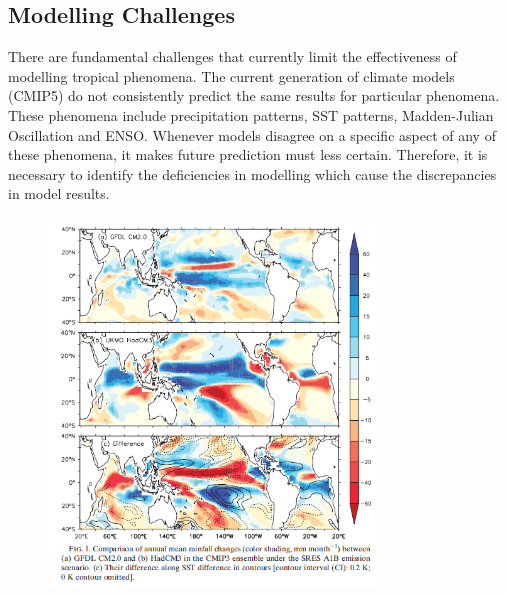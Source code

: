 \subsection{Modelling Challenges}

There are fundamental challenges that currently limit the effectiveness of modelling tropical phenomena.  The current generation of climate models (CMIP5) do not consistently predict the same results for particular phenomena.  These phenomena include precipitation patterns, SST patterns, Madden-Julian Oscillation and ENSO.  Whenever models disagree on a specific aspect of any of these phenomena, it makes future prediction must less certain.  Therefore, it is necessary to identify the deficiencies in modelling which cause the discrepancies in model results.  


\begin{figure}[h!]
\begin{center}
  \includegraphics[width=0.790\textwidth]{isaac-fig1.png}
  \label{fig:isaac1}
\end{center}
\end{figure}


